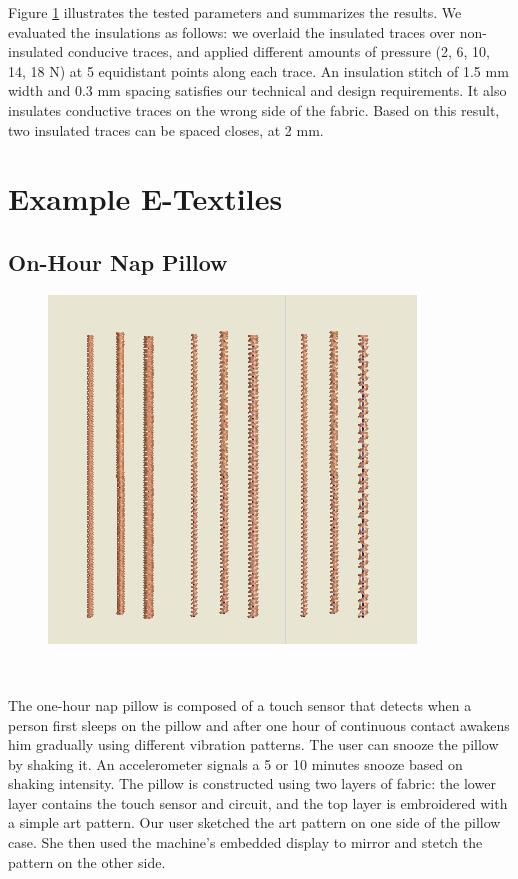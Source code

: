 \documentclass[header.tex]{subfiles}
\begin{document}
Figure \ref{fig:Insulation} illustrates the tested parameters and summarizes the results.
We evaluated the insulations as follows: we overlaid the insulated traces over non-insulated conducive traces, and applied different amounts of pressure (2, 6, 10, 14, 18 N) at 5 equidistant points along each trace. An insulation stitch of 1.5 mm width and 0.3 mm spacing satisfies our technical and design requirements. It also insulates conductive traces on the wrong side of the fabric. Based on this result, two insulated traces can be spaced closes, at 2 mm.




\section{Example E-Textiles}

\subsection{On-Hour Nap Pillow}
\begin{figure}
\centering
  \includegraphics[width=0.7\columnwidth]{figures/Insulation}
  \caption{}~\label{fig:Insulation}
  \vspace{-2.5em}
\end{figure}
The one-hour nap pillow is composed of a touch sensor that detects when a person first sleeps on the pillow and after one hour of continuous contact awakens him gradually using different vibration patterns. The user can snooze the pillow by shaking it. An accelerometer signals a 5 or 10 minutes snooze based on shaking intensity. The pillow is constructed using two layers of fabric: the lower layer contains the touch sensor and circuit, and the top layer is embroidered with a simple art pattern. Our user sketched the art pattern on one side of the pillow case. She then used the machine's embedded display to mirror and stetch the pattern on the other side. 
\end{document}
